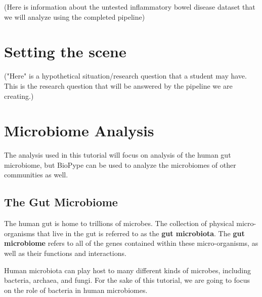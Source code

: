 (Here is information about the untested inflammatory bowel disease dataset that we will analyze using the completed pipeline)

\chapter{Setting the scene}
    \label{chap:scene}
("Here" is a hypothetical situation/research question that a student may have. This is the research question that will be answered by the pipeline we are creating.)

\chapter{Microbiome Analysis}
The analysis used in this tutorial will focus on analysis of the human gut microbiome, but BioPype can be used to analyze the microbiomes of other communities as well.
\section{The Gut Microbiome}
%
%
The human gut is home to trillions of microbes. The collection of physical micro-organisms that live in the gut is referred to as the \textbf{gut microbiota}. The \textbf{gut microbiome} refers to all of the genes contained within these micro-organisms, as well as their functions and interactions.

%
Human microbiota can play host to many different kinds of microbes, including bacteria, archaea, and fungi. For the sake of this tutorial, we are going to focus on the role of bacteria in human microbiomes.

